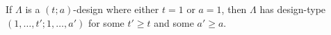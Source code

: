 If $\Lambda$ is a $(t; a)$-design where either $t = 1$ or $a = 1$, then $\Lambda$ has design-type $(1, \ldots, t'; 1, \ldots, a')$ for some $t' \geq t$ and some $a' \geq a$.
